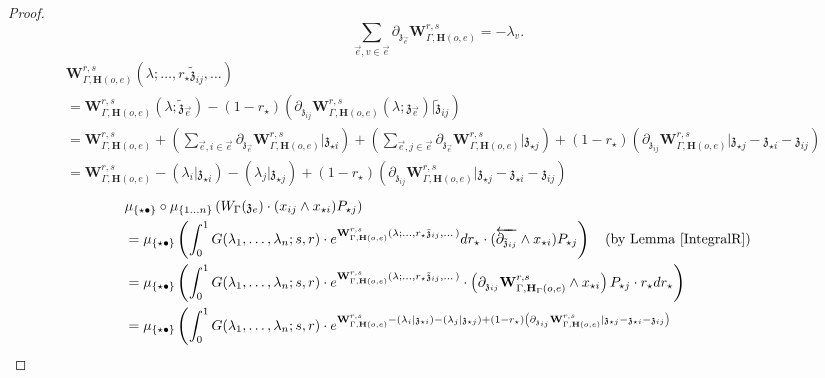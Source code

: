 \documentclass[11pt]{amsart}
\theoremstyle{definition}
\theoremstyle{remark}
\numberwithin{equation}{section}
\begin{document}
\begin{proof}
$$
 \sum_{\vec{e},v\in \vec{e}} \partial_{\mathfrak{z}_{\vec{e}}}  \mathbf{W}^{r,s}_{\Gamma,\mathbf{H}(o,e)}=-\lambda_v.
$$
\begin{align*}
   &  \mathbf{W}^{r,s}_{\Gamma,\mathbf{H}(o,e)}(\lambda;\dots,r_{\star}\tilde{\mathfrak{z}}_{ij},\dots)\\
   & =\mathbf{W}^{r,s}_{\Gamma,\mathbf{H}(o,e)}(\lambda;\tilde{\mathfrak{z}}_{\vec{e}})-(1-r_{\star})\left(\partial_{\mathfrak{z}_{ij}}\mathbf{W}^{r,s}_{\Gamma,\mathbf{H}(o,e)}(\lambda;{\mathfrak{z}}_{\vec{e}})|\tilde{\mathfrak{z}}_{ij}\right)\\
   &=\mathbf{W}^{r,s}_{\Gamma,\mathbf{H}(o,e)}+\left(\sum_{\vec{e},i\in \vec{e}} \partial_{\mathfrak{z}_{\vec{e}}}  \mathbf{W}^{r,s}_{\Gamma,\mathbf{H}(o,e)}|\mathfrak{z}_{\star i}\right)+\left(\sum_{\vec{e},j\in \vec{e}} \partial_{\mathfrak{z}_{\vec{e}}}  \mathbf{W}^{r,s}_{\Gamma,\mathbf{H}(o,e)}|\mathfrak{z}_{\star j}\right)+(1-r_{\star})\left(\partial_{\mathfrak{z}_{ij}}\mathbf{W}^{r,s}_{\Gamma,\mathbf{H}(o,e)}|\mathfrak{z}_{\star j}-\mathfrak{z}_{\star i}-\mathfrak{z}_{ij}\right)\\
   &=\mathbf{W}^{r,s}_{\Gamma,\mathbf{H}(o,e)}-\left(\lambda_i|\mathfrak{z}_{\star i}\right)-\left(\lambda_j|\mathfrak{z}_{\star j}\right)+(1-r_{\star})\left(\partial_{\mathfrak{z}_{ij}}\mathbf{W}^{r,s}_{\Gamma,\mathbf{H}(o,e)}|\mathfrak{z}_{\star j}-\mathfrak{z}_{\star i}-\mathfrak{z}_{ij}\right)
\end{align*}
    \begin{align*}
     &   \mu_{\{\star\bullet\}}\circ \mu_{\{1\dots n\}}\left(W_{\Gamma}(\mathfrak{z}_{e})\cdot (x_{ij}\wedge x_{\star i})P_{\star j }\right) \\
     & =\mu_{\{\star\bullet\}}\left(\int^1_0G(\lambda_1,\dots,\lambda_{n};s,r)\cdot e^{   \mathbf{W}^{r,s}_{\Gamma,\mathbf{H}(o,e)}(\lambda;\dots,r_{\star}\tilde{\mathfrak{z}}_{ij},\dots)}dr_{\star}\cdot (\overleftarrow{\partial_{ \tilde{\mathfrak{z}}_{ij}}}\wedge x_{\star i})P_{\star j }\right)\quad (\text{by Lemma \ref{IntegralR}})\\
     & =\mu_{\{\star\bullet\}}\left(\int^1_0G(\lambda_1,\dots,\lambda_{n};s,r)\cdot e^{   \mathbf{W}^{r,s}_{\Gamma,\mathbf{H}(o,e)}(\lambda;\dots,r_{\star}\tilde{\mathfrak{z}}_{ij},\dots)}\cdot \left(\partial_{\mathfrak{z}_{ij}}\mathbf{W}^{r,s}_{\Gamma,\mathbf{H}_{\Gamma}(o,e)}\wedge x_{\star i}\right)P_{\star j}\cdot r_{\star}dr_{\star}\right)\\
          & =\mu_{\{\star\bullet\}}\left(\int^1_0G(\lambda_1,\dots,\lambda_{n};s,r)\cdot e^{\mathbf{W}^{r,s}_{\Gamma,\mathbf{H}(o,e)}-\left(\lambda_i|\mathfrak{z}_{\star i}\right)-\left(\lambda_j|\mathfrak{z}_{\star j}\right)+(1-r_{\star})\left(\partial_{\mathfrak{z}_{ij}}\mathbf{W}^{r,s}_{\Gamma,\mathbf{H}(o,e)}|\mathfrak{z}_{\star j}-\mathfrak{z}_{\star i}-\mathfrak{z}_{ij}\right)}\right.\\

\end{align*}
\end{proof}
\end{document}
